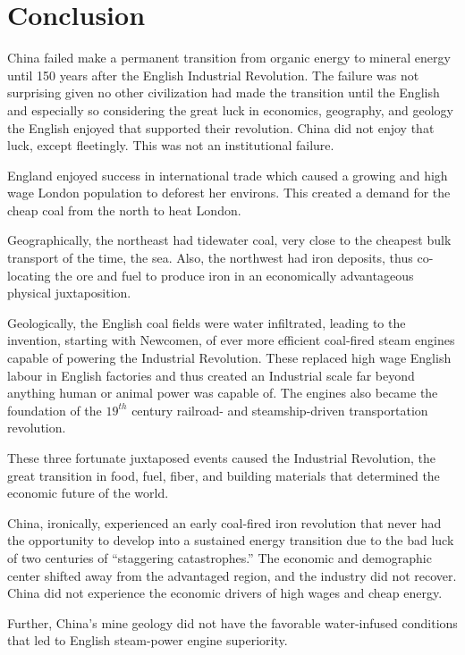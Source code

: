 \documentclass[12pt]{article}
\numberwithin{equation}{section}
\begin{document}
	\section{Conclusion}

	China failed make a permanent transition from organic energy to mineral energy until 150 years after the English Industrial Revolution. The failure was not surprising given no other civilization had made the transition until the English and especially so considering the great luck in economics, geography, and geology the English enjoyed that supported their revolution. China did not enjoy that luck, except fleetingly. This was not an institutional failure.
	
	England enjoyed success in international trade which caused a growing and high wage London population to deforest her environs. This created a demand for the cheap coal from the north to heat London. 
	
	Geographically, the northeast had tidewater coal, very close to the cheapest bulk transport of the time, the sea. Also, the northwest had iron deposits, thus co-locating the ore and fuel to produce iron in an economically advantageous physical juxtaposition. 
	
	Geologically, the English coal fields were water infiltrated, leading to the invention, starting with Newcomen, of ever more efficient coal-fired steam engines capable of powering the Industrial Revolution. These replaced high wage English labour in English factories and thus created an Industrial scale far beyond anything human or animal power was capable of. The engines also became the foundation of the $19^{th}$ century railroad- and steamship-driven transportation revolution.
	
	These three fortunate juxtaposed events caused the Industrial Revolution, the great transition in food, fuel, fiber, and building materials that determined the economic future of the world.
	
	China, ironically, experienced an early coal-fired iron revolution that never had the opportunity to develop into a sustained energy transition due to the bad luck of two centuries of ``staggering catastrophes.'' The economic and demographic center shifted away from the advantaged region, and the industry did not recover. China did not experience the economic drivers of high wages and cheap energy.
	
	Further, China's mine geology did not have the favorable water-infused conditions that led to English steam-power engine superiority.
	
\end{document}
